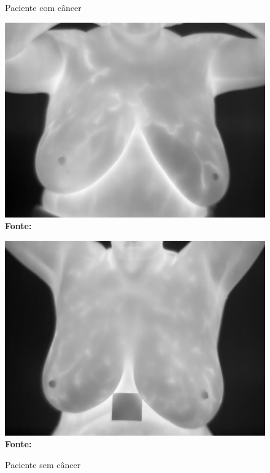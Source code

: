 \begin{figure}[ht]
\centering
    \begin{minipage}[b]{0.45\textwidth}
        \centering
        \caption{Paciente com câncer}
        \includegraphics[width=\textwidth]{figuras/paciente_com_cancer.jpg}
        \label{fig:pcc}
        \textbf{\footnotesize Fonte: \href{http://visual.ic.uff.br/dmi}{\cite{database}}}
    \end{minipage}
    \hfill
    \begin{minipage}[b]{0.45\textwidth}
        \centering
        \caption{Paciente sem câncer}
        \includegraphics[width=\textwidth]{figuras/paciente_sem_cancer.jpg}
        \label{fig:psc}
        \textbf{\footnotesize Fonte: \href{http://visual.ic.uff.br/dmi}{\cite{database}}}
    \end{minipage}
\end{figure}



